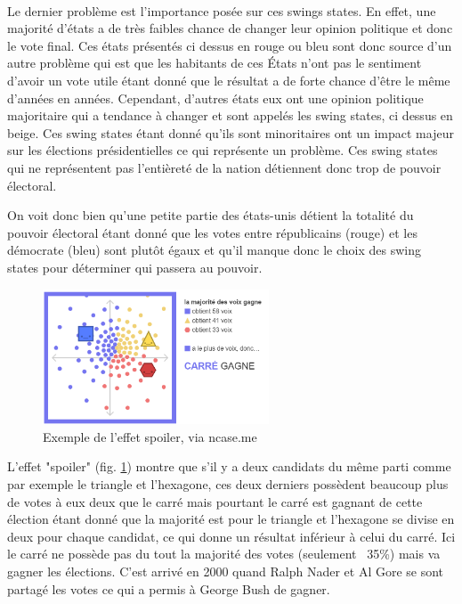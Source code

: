 \documentclass[11pt,a4paper]{report}
\begin{document}
\paragraph{}
Le dernier problème est l’importance posée sur ces swings states.
En effet, une majorité d’états a de très faibles chance de changer leur opinion politique et donc le vote final.
Ces états présentés ci dessus en rouge ou bleu sont donc source d’un autre problème qui est que les habitants de ces États n’ont pas le sentiment d’avoir un vote utile étant donné que le résultat a de forte chance d’être le même d’années en années.
Cependant, d’autres états eux ont une opinion politique majoritaire qui a tendance à changer et sont appelés les swing states, ci dessus en beige.
Ces swing states étant donné qu’ils sont minoritaires ont un impact majeur sur les élections présidentielles ce qui représente un problème.
Ces swing states qui ne représentent pas l'entièreté de la nation détiennent donc trop de pouvoir électoral.
\nocite{greelane:eleccoll}
\nocite{gov:fedpapers68}

On voit donc bien qu'une petite partie des états-unis détient la totalité du pouvoir électoral étant donné que les votes entre républicains (rouge) et les démocrate (bleu) sont plutôt égaux et qu'il manque donc le choix des swing states pour déterminer qui passera au pouvoir.

\begin{figure}[h]
	\centering
	\includegraphics[width=0.6\textwidth]{./images/spoiler-effect.png}
	\caption{Exemple de l'effet spoiler, via ncase.me \cite{ncase:ballot}}
	\label{sim:spoilereffect}
\end{figure}

L'effet "spoiler" (fig. \ref{sim:spoilereffect}) montre que s'il y a deux candidats du même parti comme par exemple le triangle et l'hexagone, ces deux derniers possèdent beaucoup plus de votes à eux deux que le carré mais pourtant le carré est gagnant de cette élection étant donné que la majorité est pour le triangle et l'hexagone se divise en deux pour chaque candidat, ce qui donne un résultat inférieur à celui du carré.
Ici le carré ne possède pas du tout la majorité des votes (seulement ~35\%) mais va gagner les élections.
C'est arrivé en 2000 quand Ralph Nader et Al Gore se sont partagé les votes ce qui a permis à George Bush de gagner.
\nocite{ncase:ballot}
\end{document}
